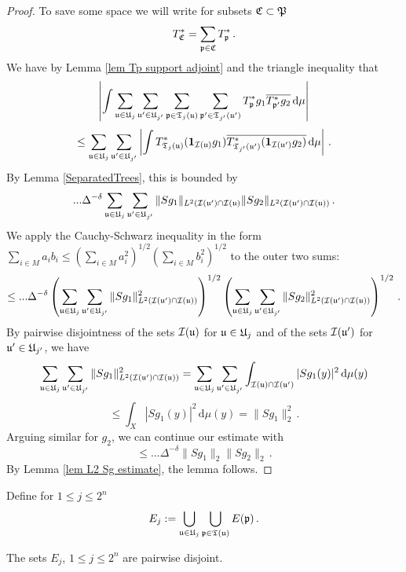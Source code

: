 \begin{proof}
    To save some space we will write for subsets $\mathfrak C \subset \mathfrak P$
    $$
        T_{\mathfrak C}^* = \sum_{\mathfrak p \in \mathfrak C} T_{\mathfrak p}^*\,.
    $$
    We have by Lemma \ref{lem Tp support adjoint} and the triangle inequality that
    $$
        \left| \int \sum_{\mathfrak u \in \mathfrak U_j} \sum_{\mathfrak u' \in \mathfrak U_{j'}} \sum_{\mathfrak p \in \mathfrak T_j(\mathfrak u)} \sum_{\mathfrak p' \in \mathfrak T_{j'}(\mathfrak u')} T^*_{\mathfrak p} g_1 \overline{T^*_{\mathfrak p'} g_2} \, \mathrm{d}\mu \right|
    $$
    $$
        \le   \sum_{\mathfrak u \in \mathfrak U_j} \sum_{\mathfrak u' \in \mathfrak U_{j'}} \left| \int   T^*_{\mathfrak T_j(\mathfrak u)} (\mathbf{1}_{\mathcal{I}(\mathfrak u)} g_1) \overline{T^*_{\mathfrak T_{j'}(\mathfrak u')} (\mathbf{1}_{\mathcal{I}(\mathfrak u')} g_2)} \, \mathrm{d}\mu \right|\,.
    $$
    By Lemma \ref{SeparatedTrees}, this is bounded by 
    $$
        ... \Delta^{-\delta} \sum_{\mathfrak u \in \mathfrak U_j} \sum_{\mathfrak u' \in \mathfrak U_{j'}} \|S g_1\|_{L^2(\mathcal{I}(\mathfrak u')\cap \mathcal{I}(\mathfrak u)} \|Sg_2\|_{L^2(\mathcal{I}(\mathfrak u')\cap\mathcal{I}(\mathfrak u))}\,.
    $$
    We apply the Cauchy-Schwarz inequality in the form $\sum_{i \in M} a_i b_i \le (\sum_{i \in M} a_i^2 )^{1/2}(\sum_{i \in M} b_i^2 )^{1/2}$ to the outer two sums:
    $$
        \le ... \Delta^{-\delta} \left(\sum_{\mathfrak u \in \mathfrak U_j} \sum_{\mathfrak u' \in \mathfrak U_{j'}} \|S g_1\|_{L^2(\mathcal{I}(\mathfrak u')\cap \mathcal{I}(\mathfrak u))}^2 \right)^{1/2} \left(\sum_{\mathfrak u \in \mathfrak U_j} \sum_{\mathfrak u' \in \mathfrak U_{j'}} \|S g_2\|_{L^2(\mathcal{I}(\mathfrak u')\cap\mathcal{I}(\mathfrak u))}^2 \right)^{1/2}\,.
    $$
    By pairwise disjointness of the sets $\mathcal{I}(\mathfrak u)$ for $\mathfrak u \in \mathfrak U_j$ and of the sets $\mathcal{I}(\mathfrak u')$ for $\mathfrak u' \in \mathfrak U_{j'}$, we have
    $$
        \sum_{\mathfrak u \in \mathfrak U_j}\sum_{\mathfrak u' \in \mathfrak U_{j'}} \|S g_1\|_{L^2(\mathcal{I}(\mathfrak u')\cap \mathcal{I}(\mathfrak u))}^2
        = \sum_{\mathfrak u \in \mathfrak U_j}\sum_{\mathfrak u' \in \mathfrak U_{j'}} \int_{\mathcal{I}(\mathfrak u) \cap \mathcal{I}(\mathfrak u')} |Sg_1(y)|^2 \, \mathrm{d}\mu(y)
    $$
    $$
        \le \int_X |Sg_1(y)|^2 \, \mathrm{d}\mu(y) = \|Sg_1\|_2^2\,.
    $$
    Arguing similar for $g_2$, we can  continue our estimate with
    $$
        \le ... \Delta^{-\delta} \|Sg_1\|_2 \|Sg_2\|_2\,.
    $$
    By Lemma \ref{lem L2 Sg estimate}, the lemma follows.
\end{proof}

Define for $1 \le j \le 2^n$
$$
    E_j := \bigcup_{\mathfrak u \in \mathfrak U_j} \bigcup_{\mathfrak p \in \mathfrak T(\mathfrak u)} E(\mathfrak p)\,.
$$

\begin{lemma}
    \label{lem disjoint support}
    The sets $E_j$, $1 \le j \le 2^n$ are pairwise disjoint.
\end{lemma}

